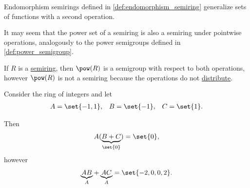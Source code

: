 \begin{example}
\begin{thmenum}
     Endomorphism semirings defined in \cref{def:endomorphism_semiring} generalize sets of functions with a second operation.

     It may seem that the power set of a semiring is also a semiring under pointwise operations, analogously to the power semigroups defined in \cref{def:power_semigroup}.

    If \( R \) is a \hyperref[def:semiring]{semiring}, then \( \pow(R) \) is a semigroup with respect to both operations, however \( \pow(R) \) is not a semiring because the operations do not \hyperref[eq:def:semiring/theory/axioms/distributivity/left]{distribute}.

    Consider the ring of integers and let
    \begin{align*}
      A = \set{ -1, 1 },
      &&
      B = \set{ -1 },
      &&
      C = \set{ 1 }.
    \end{align*}

    Then
    \begin{equation*}
      A(\underbrace{B + C}_{\set{ 0 }})
      =
      \set{ 0 },
    \end{equation*}
    however
    \begin{equation*}
      \underbrace{AB}_{A} + \underbrace{AC}_{A}
      =
      \set{ -2, 0, 0, 2 }.
    \end{equation*}
  \end{thmenum}
\end{example}

